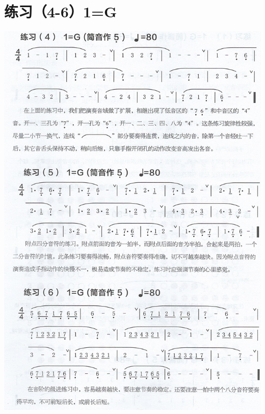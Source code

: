 \documentclass[cn,pad,chinese,chinesefont=nofont]{elegantbook}
\begin{document}
\section{练习（4-6）1=G}
\includegraphics[height=\textheight]{dongxiao/Scan 2.jpeg}
\end{document}
